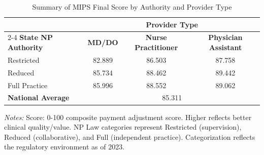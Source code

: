 \begin{table}[htbp]
    \centering
    \caption{Summary of MIPS Final Score by Authority and Provider Type}
    \label{tab:mips_final_score}
    \vspace{0.2cm}
    \begin{tabular}{lccc}
        \toprule
        & \multicolumn{3}{c}{\textbf{Provider Type}} \\
        \cmidrule(lr){2-4}
        \textbf{State NP Authority} & \textbf{MD/DO} & \textbf{Nurse Practitioner} & \textbf{Physician Assistant} \\
        \midrule
        Restricted & 82.889 & 86.503 & 87.758 \\
        Reduced & 85.734 & 88.462 & 89.442 \\
        Full Practice & 85.996 & 88.552 & 89.062 \\
        \midrule
        \textbf{National Average} & \multicolumn{3}{c}{85.311} \\
        \bottomrule
    \end{tabular}
    \vspace{0.1cm}
    \begin{minipage}{0.85\textwidth}
        \footnotesize \textit{Notes:} Score: 0-100 composite payment adjustment score. Higher reflects better clinical quality/value. NP Law categories represent Restricted (supervision), Reduced (collaborative), and Full (independent practice). Categorization reflects the regulatory environment as of 2023.
    \end{minipage}
\end{table}